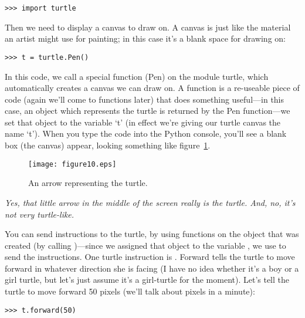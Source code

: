 \begin{listing}
\begin{verbatim}
>>> import turtle
\end{verbatim}
\end{listing}

Then we need to display a canvas to draw on.  A canvas is just like the material an artist might use for painting; in this case it's a blank space for drawing on:

\begin{listing}
\begin{verbatim}
>>> t = turtle.Pen()
\end{verbatim}
\end{listing}

In this code, we call a special function (Pen) on the module turtle, which automatically creates a canvas we can draw on.  A function is a re-useable piece of code (again we'll come to functions later) that does something useful---in this case, an object which represents the turtle is returned by the Pen function---we set that object to the variable `t' (in effect we're giving our turtle canvas the name `t'). When you type the code into the Python console, you'll see a blank box (the canvas) appear, looking something like figure~\ref{fig10}.

\begin{figure}
\begin{center}
\texttt{[image: figure10.eps]}
\end{center}
\caption{An arrow representing the turtle.}\label{fig10}
\end{figure}

\emph{Yes, that little arrow in the middle of the screen really is the turtle.  And, no, it's not very turtle-like.}

You can send instructions to the turtle, by using functions on the object that was created (by calling )---since we assigned that object to the variable , we use  to send the instructions.
One turtle instruction is .  Forward tells the turtle to move forward in whatever direction she is facing (I have no idea whether it's a boy or a girl turtle, but let's just assume it's a girl-turtle for the moment). Let's tell the turtle to move forward 50 pixels (we'll talk about pixels in a minute):

\begin{listing}
\begin{verbatim}
>>> t.forward(50)
\end{verbatim}
\end{listing}

